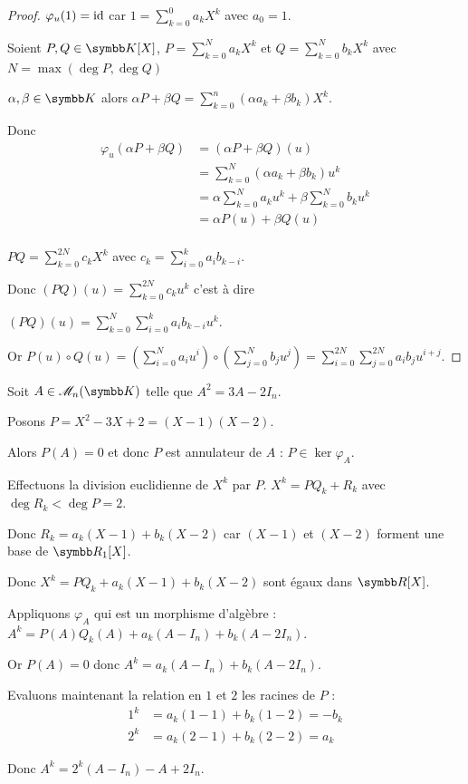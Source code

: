 \begin{proof}
    $\varphi_u(1) = \operatorname{id}$ car $\displaystyle 1 = \sum_{k = 0 }^{ 0 } a_k X^k$ avec $a_0 = 1$.

    Soient $P, Q \in \K[X]$, $\displaystyle P = \sum_{k = 0 }^{ N } a_k X^k$ et $\displaystyle Q = \sum_{k = 0 }^{ N} b_k X^k$
    avec $N = \max(\deg P, \deg Q)$ 

    $\alpha, \beta \in \K$ alors $\displaystyle\alpha P + \beta Q = \sum_{k = 0 }^{n } (\alpha a_k + \beta b_k) X^k$.

    Donc 
    \begin{align}
        \varphi_u(\alpha P + \beta Q) & = (\alpha P + \beta Q)(u) \\
        & = \sum_{k = 0 }^{ N } (\alpha a_k + \beta b_k) u^k \\
        & = \alpha \sum_{k = 0 }^{ N } a_k u^k + \beta \sum_{k = 0 }^{ N } b_k u^k \\
        & = \alpha P(u) + \beta Q(u) \\
    \end{align}

    $\displaystyle PQ = \sum_{k = 0 }^{ 2N } c_k X^k$ avec $\displaystyle c_k = \sum_{i = 0 }^{ k } a_i b_{k - i}$.

    Donc $\displaystyle (PQ)(u) = \sum_{k = 0 }^{ 2N } c_k u^k$ c'est à dire 

    $\displaystyle (PQ)(u) = \sum_{k = 0 }^{ N} \sum_{i = 0 }^{k } a_i b_{k - i} u^k$.

    Or $\displaystyle P(u) \circ Q(u) = (\sum_{i = 0 }^{ N } a_i u^i)\circ( \sum_{j = 0 }^{ N } b_j u^j)
    = \sum_{i = 0 }^{ 2N} \sum_{j = 0 }^{2N } a_i b_j u^{i + j}$.
\end{proof}



\begin{exemple}
    Soit $A \in \mathscr M_n(\K)$ telle que $A^2 = 3A - 2 I_n$. 

    Posons $P = X^2 - 3X + 2 = (X - 1)(X - 2)$.

    Alors $P(A) = 0$ et donc $P$ est annulateur de $A$ : $P \in \ker \varphi_A$.

    Effectuons la division euclidienne de $X^k$ par $P$. $X^k = PQ_k + R_k$ avec 
    $\deg R_k < \deg P = 2$.

    Donc $R_k = a_k(X - 1) + b_k (X - 2)$ car $(X - 1)$ et $(X - 2)$ forment une base de $\R_1[X]$.

    Donc $X^k = P Q_k + a_k (X - 1) + b_k (X - 2)$ sont égaux dans $\R[X]$. 

    Appliquons $\varphi_A$ qui est un morphisme d'algèbre : $A^k = P(A) Q_k(A) + a_k (A - I_n) + b_k (A - 2 I_n)$.

    Or $P(A) = 0$ donc $A^k = a_k (A - I_n) + b_k (A - 2 I_n)$.

    Evaluons maintenant la relation en $1$ et $2$ les racines de $P$ : 
    \begin{align}
        1^k & = a_k (1 - 1) + b_k (1 - 2) = -b_k \\
        2^k & = a_k (2 - 1) + b_k (2 - 2) = a_k
    \end{align}

    Donc $A^k = 2^k (A - I_n) - A + 2 I_n$.
\end{exemple}


